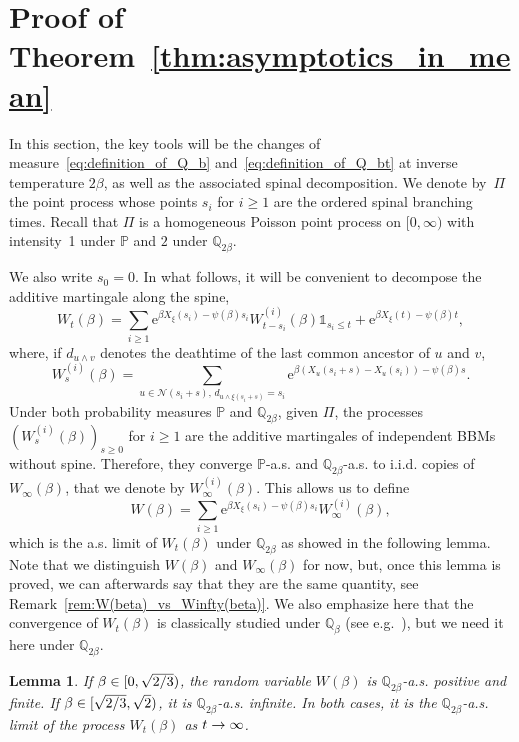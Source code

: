 \documentclass[10pt]{amsart}
\newtheorem{lemm}[theo]{Lemma}\newtheorem{prop}[theo]{Proposition}\newtheorem{coro}[theo]{Corollary}\newtheorem{conj}[theo]{Conjecture}
\theoremstyle{definition}\newtheorem{defi}[theo]{Definition}\newtheorem{rema}[theo]{Remark}\newtheorem{exam}[theo]{Example}\newtheorem{exem}[theo]{Example}\newtheorem{nota}[theo]{Notation}
\newcommand{\e}{\mathrm{e}}
\renewcommand{\P}{\mathbb{P}}
\newcommand{\Q}{\mathbb{Q}}
\newcommand\1{\mathds{1}}
\newcommand{\cN}{\mathcal{N}}
\renewcommand*{\to}{\mathchoice{\longrightarrow}{\rightarrow}{\rightarrow}{\rightarrow}}
\begin{document}
\section{Proof of Theorem~\ref{thm:asymptotics_in_mean}}\label{sec:mean}

In this section, the key tools will be the changes of measure~\eqref{eq:definition_of_Q_b} and~\eqref{eq:definition_of_Q_bt} at inverse temperature $2\beta$, as well as the associated spinal decomposition. We denote by~$\Pi$ the point process whose points $s_i$ for $i \geq 1$ are the ordered spinal branching times. Recall that $\Pi$ is a homogeneous Poisson point process on $[0,\infty)$ with intensity~1 under $\P$ and $2$ under $\Q_{2\beta}$.

We also write $s_0 = 0$. In what follows, it will be convenient to decompose the additive martingale along the spine,
\begin{equation}\label{eq:decompo_W_t_spine}
W_t(\beta) = \sum_{i \geq 1} \e^{\beta X_\xi(s_i) - \psi(\beta)s_i} W_{t - s_i}^{(i)}(\beta) \1_{s_i \leq t} + \e^{\beta X_\xi(t) - \psi(\beta)t},
\end{equation}
where, if $d_{u \wedge v}$ denotes the deathtime of the last common ancestor of $u$ and $v$,
\begin{equation*}
W_s^{(i)}(\beta) = \sum_{u \in \cN(s_i + s),\, d_{u \wedge \xi(s_i + s)} = s_i} \e^{\beta (X_u(s_i + s) - X_u(s_i)) - \psi(\beta)s}.
\end{equation*}
Under both probability measures $\P$ and $\Q_{2\beta}$, given $\Pi$, the processes $(W_s^{(i)}(\beta))_{s \geq 0}$ for $i \geq 1$ are the additive martingales of independent BBMs without spine. Therefore, they converge $\P$-a.s. and $\Q_{2\beta}$-a.s. to i.i.d. copies of $W_\infty(\beta)$, that we denote by $W_\infty^{(i)}(\beta)$. This allows us to define
\begin{equation}\label{eq:definition_W}
W(\beta) = \sum_{i \geq 1} \e^{\beta X_\xi(s_i) - \psi(\beta)s_i} W_\infty^{(i)}(\beta),
\end{equation}
which is the a.s. limit of $W_t(\beta)$ under $\Q_{2\beta}$ as showed in the following lemma. Note that we distinguish $W(\beta)$ and $W_\infty(\beta)$ for now, but, once this lemma is proved, we can afterwards say that they are the same quantity, see Remark~\ref{rem:W(beta)_vs_Winfty(beta)}. We also emphasize here that the convergence of $W_t(\beta)$ is classically studied under $\Q_\beta$ (see e.g.~\cite{Kyprianou2004}), but we need it here under $\Q_{2\beta}$.

\begin{lemm}\label{lem:almost_sure_convergence_of_W_t}
If $\beta \in [0, \sqrt{2\smash{/}3})$, the random variable $W(\beta)$ is $\Q_{2\beta}$-a.s. positive and finite. If $\beta \in [\sqrt{2\smash{/}3}, \sqrt{2})$, it is $\Q_{2\beta}$-a.s. infinite. In both cases, it is the $\Q_{2\beta}$-a.s. limit of the process $W_t(\beta)$ as $t \to \infty$.
\end{lemm}
\end{document}
